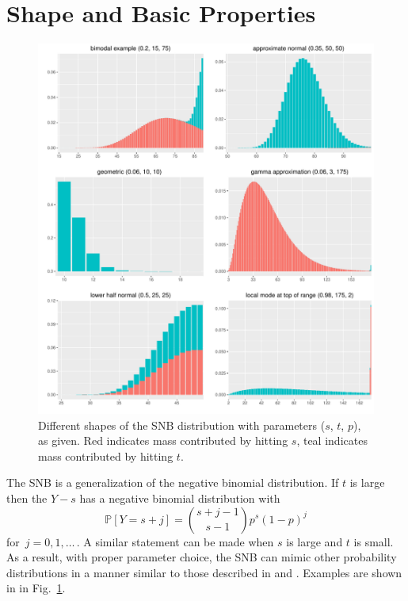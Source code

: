 \documentclass[review]{elsarticle}
\begin{document}
\section{Shape and Basic Properties}

\begin{figure}[p!]
\begin{center}
\includegraphics[width=\textwidth]{shapes.pdf}
\end{center}
\caption{Different shapes of the SNB distribution with parameters ($s$, $t$, $p$), as given. Red indicates mass contributed by hitting $s$, teal indicates
mass contributed by hitting $t$. \label{shapes.fig}}
\end{figure}

The SNB is a generalization of the negative 
binomial distribution. If $t$ is large then the $Y-s$ has a 
negative binomial distribution with
\begin{equation*}                                    %
\mathbb{P}[Y=s+j]        \label{nb1.eq}          
  = {{s+j-1}\choose{s-1}} p^s (1-p)^j
\end{equation*}
for $\,j=0, 1,\ldots\,$. A similar statement can be made when $s$ is large
and $t$ is small. As a result, with proper parameter choice, the SNB
can mimic other probability distributions in a manner similar to 
those described in \cite{Peizer1968} and \cite{Best1974}. Examples are
shown in in Fig.~\ref{shapes.fig}. 
\end{document}
